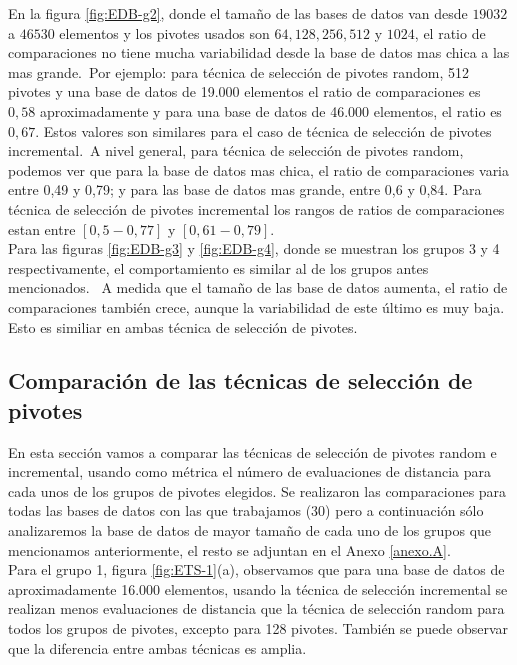 En la figura \ref{fig:EDB-g2}, donde el tama\~no de las bases de datos van desde $19032$ a $46530$ elementos y los pivotes usados son $64, 128, 256, 512$ y $1024$, el ratio de comparaciones no tiene mucha variabilidad desde la base de datos mas chica a las mas grande.\
Por ejemplo: para t\'ecnica de selecci\'on de pivotes random, 512 pivotes y una base de datos de 19.000 elementos el ratio de comparaciones es $0,58$ aproximadamente y para una base de datos de 46.000 elementos, el ratio es $0,67$. Estos valores son similares para el caso de t\'ecnica de selecci\'on de pivotes incremental.\
A nivel general, para t\'ecnica de selecci\'on de pivotes random, podemos ver que para la base de datos mas chica, el ratio de comparaciones varia entre 0,49 y 0,79; y para las base de datos mas grande, entre 0,6 y 0,84. Para t\'ecnica de selecci\'on de pivotes incremental los rangos de ratios de comparaciones estan entre $[0,5 - 0,77]$ y $[0,61 - 0,79]$. \\

Para las figuras \ref{fig:EDB-g3} y \ref{fig:EDB-g4}, donde se muestran los grupos 3 y 4 respectivamente, el comportamiento es similar al de los grupos antes mencionados.	\
A medida que el tama\~no de las base de datos aumenta, el ratio de comparaciones tambi\'en crece, aunque la variabilidad de este \'ultimo es muy baja. Esto es similiar en ambas  t\'ecnica de selecci\'on de pivotes.

\subsection{Comparaci\'on de las t\'ecnicas de selecci\'on de pivotes}

En esta secci\'on vamos a comparar las t\'ecnicas de selecci\'on de pivotes random e incremental, usando como m\'etrica el n\'umero de evaluaciones de distancia para cada unos de los grupos de pivotes elegidos. Se realizaron las comparaciones para todas las bases de datos con las que trabajamos (30) pero a continuaci\'on s\'olo analizaremos la base de datos de mayor tama\~no de cada uno de los grupos que mencionamos anteriormente, el resto se adjuntan en el Anexo \ref{anexo.A}.\\

Para el grupo 1, figura \ref{fig:ETS-1}(a), observamos que para una base de datos de aproximadamente 16.000 elementos,  usando la t\'ecnica de selecci\'on incremental se realizan menos evaluaciones de distancia que la t\'ecnica de selecci\'on random para todos los grupos de pivotes, excepto para 128 pivotes. Tambi\'en se puede observar que la diferencia entre ambas t\'ecnicas es amplia.\\

